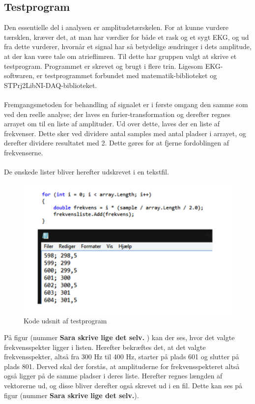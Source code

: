\subsection{Testprogram}
Den essentielle del i analysen er amplitudetærskelen. For at kunne vurdere tærsklen, kræver det, at man har værdier for både et rask og et sygt EKG, og ud fra dette vurderer, hvornår et signal har så betydelige ændringer i dets amplitude, at der kan være tale om atrieflimren. Til dette har gruppen valgt at skrive et testprogram. Programmet er skrevet og brugt i flere trin. Ligesom EKG-softwaren, er testprogrammet forbundet med matematik-biblioteket og STPrj2LibNI-DAQ-biblioteket. \\ \\
Fremgangsmetoden for behandling af signalet er i første omgang den samme som ved den reelle analyse; der laves en furier-transformation og derefter regnes arrayet om til en liste af amplituder. Ud over dette, laves der en liste af frekvenser. Dette sker ved dividere antal samples med antal pladser i arrayet, og derefter dividere resultatet med 2. Dette gøres for at fjerne fordoblingen af frekvenserne. \\ \\
De ønskede lister bliver herefter udskrevet i en tekstfil.


\begin{figure}[H]
	\centering
	\includegraphics[width=1\textwidth]{Figurer/Snip20150520_12}
	\caption{Kode udsnit af testprogram}
\end{figure}

På figur (nummer \textbf{Sara skrive lige det selv.} ) kan der ses, hvor det valgte frekvensspekter ligger i listen. Herefter bekræftes det, at det valgte frekvensspekter, altså fra 300 Hz til 400 Hz, starter på plads 601 og slutter på plads 801. Derved skal der forstås, at amplituderne for frekvensspekteret altså også ligger på de samme pladser i deres liste. Herefter regnes længden af vektorerne ud, og disse bliver derefter også skrevet ud i en fil. Dette kan ses på figur (nummer \textbf{Sara skrive lige det selv.}). 


